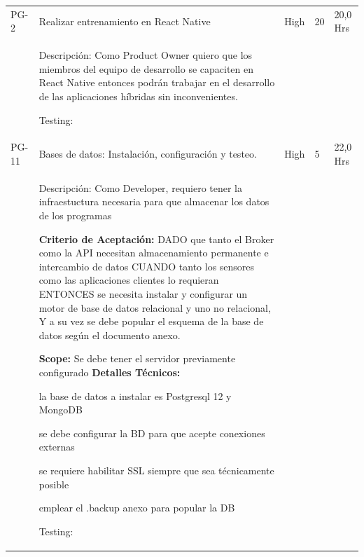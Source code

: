 \documentclass[11pt]{charter}
\begin{document}
\begin{landscape}
\begin{tabularx}{\linewidth}{@{}|p{1.3cm}|p{17cm}|p{1.7cm}|p{1.5cm}|p{1.7cm}|@{}}
PG-2     & Realizar entrenamiento en React   Native         & High               & 20  & 20,0  Hrs         \\
         &  \begin{description}
                   \item Descripción:  Como Product Owner quiero que los miembros del equipo de desarrollo se capaciten en React Native entonces podrán trabajar en el desarrollo de las aplicaciones híbridas sin inconvenientes.                 
                   \item Testing:
            \end{description}            &  &     & \\            
PG-11    & Bases de datos: Instalación,   configuración y testeo.             & High               & 5   & 22,0  Hrs         \\
         &  \begin{description}          
                   \item Descripción:  Como Developer, requiero tener la infraestuctura necesaria para que   almacenar los datos de los programas                 
                   \item \textbf{Criterio de Aceptación:} DADO que tanto el Broker como la API necesitan almacenamiento permanente e   intercambio de datos CUANDO tanto los sensores como las aplicaciones clientes lo requieran ENTONCES se necesita instalar y configurar un motor de base de datos relacional y uno no relacional,  Y a su vez se debe popular el esquema de la base de datos según el documento anexo.
                   \item \textbf{Scope:} Se debe tener el servidor previamente configurado      
				   \textbf{Detalles Técnicos:}
                   \begin{description} 
                         \item la base de datos a instalar es Postgresql 12 y MongoDB 
                         \item se debe configurar la BD para que acepte conexiones externas 
                         \item se requiere habilitar SSL siempre que sea técnicamente posible 
                         \item emplear el .backup anexo para popular la DB 
				   \end{description}
                   \item Testing:
            \end{description}    &  &     & \\ 

\end{tabularx}
\end{landscape}
\end{document}
